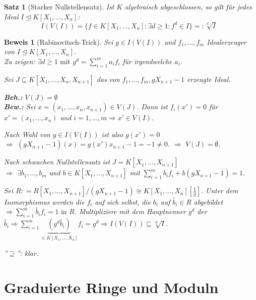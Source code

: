\documentclass[a4paper,12pt]{scrbook}
\theoremstyle{break}
\theoremstyle{nonumberbreak}
\newtheorem{Bew}{Beweis}
\newtheorem{nnSatz}{Satz}
\theoremstyle{nonumberplain}
\newcommand{\defeqr}[0]{\mathrel{\mathop:}=}
\newcommand{\defeql}[0]{=\mathrel{\mathop:}}
\begin{document}
\begin{nnSatz}[Starker Nullstellensatz]
  Ist $K$ algebraisch abgeschlossen, so gilt für jedes Ideal $I \trianglelefteq K[X_1, \dots, X_n]$:
  $$I(V(I)) = \{ f \in K[X_1, \dots, X_n]: \exists d \ge 1: f^d \in I \} \defeql \sqrt[d]{I}$$
\end{nnSatz}

\begin{Bew}[Rabinovitsch-Trick]
  Sei $g \in I(V(I))$ und $f_1, \dots, f_m$ Idealerzeuger von $I \trianglelefteq K[X_1, \dots, X_n]$.\\
  Zu zeigen: $\exists d \geq 1 \text{ mit } g^d = \sum_{i = 1}^m a_i f_i$ für irgendwelche $a_i$.

  Sei $J \subseteq K[X_1, \dots, X_n, X_{n+1}]$ das von $f_1, \dots, f_m, gX_{n+1}-1$ erzeugte Ideal.

  \textbf{Beh.:} $V(J) = \emptyset$\\
  \textbf{Bew.:} Sei $x = (x_1, \dots, x_n, x_{n+1}) \in V(J)$.
  Dann ist $f_i(x') = 0$ für $x' = (x_1, \dots, x_n)$ und $i = 1, \dots, m \Rightarrow x' \in V(I)$.

  Nach Wahl von $g \in I(V(I))$ ist also $g(x') = 0$\\
  $\Rightarrow$ $(gX_{n+1}-1)(x) = g(x') x_{n+1} - 1 = -1 \not= 0$. $\Rightarrow$ $V(J) = \emptyset$.

  Nach schwachen Nullstellensatz ist $J = K[X_1, \dots, X_{n+1}]$\\
  $\Rightarrow$ $\exists b_1, \dots, b_m$ und $b \in K[X_1, \dots, X_{n+1}]$ mit $\sum_{i=1}^m b_i f_i + b(gX_{n+1} - 1) = 1$.

  Sei $R \defeqr R[X_1, \dots, X_{n+1}]/ (gX_{n+1} - 1) \cong K[X_1, \dots, X_n][\frac{1}{g}]$. Unter dem Isomorphismus werden die $f_i$ auf sich selbst, die $b_i$ auf $\tilde{b_i} \in R$ abgebildet $\Rightarrow \sum_{i = 1}^m \tilde{b_i} f_i = 1 \text{ in } R$.
  Multipliziere mit dem Hauptnenner $g^d$ der $\tilde{b_i} \Rightarrow \sum_{i = 1}^m \underset{\in K[X_1, \dots, X_n]}{\underbrace{(g^d \tilde{b_i})}} f_i = g^d \Rightarrow I(V(I)) \subseteq \sqrt[d]{I}$.

  ''$\supseteq$'': klar.
\end{Bew}
\section{Graduierte Ringe und Moduln}
\end{document}
